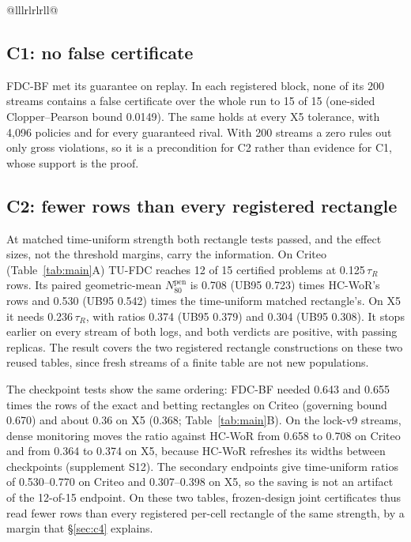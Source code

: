 \documentclass[sigconf,anonymous,review]{acmart}
\newcommand{\Npen}{N_{80}^{\text{pen}}}
\begin{document}
\begin{table}[t]
\begin{tabular}{@{}lllrlrlrll@{}}
\midrule
{} \\
\bottomrule
\end{tabular}
\end{table}

\subsection{C1: no false certificate}\label{sec:c1}

FDC-BF met its guarantee on replay. In each registered block, none of its 200 streams contains a false certificate over the whole run to 15 of 15 (one-sided Clopper--Pearson bound 0.0149). The same holds at every X5 tolerance, with 4,096 policies and for every guaranteed rival. With 200 streams a zero rules out only gross violations, so it is a precondition for C2 rather than evidence for C1, whose support is the proof.

\subsection{C2: fewer rows than every registered rectangle}\label{sec:c2}

At matched time-uniform strength both rectangle tests passed, and the effect sizes, not the threshold margins, carry the information. On Criteo (Table~\ref{tab:main}A) TU-FDC reaches 12 of 15 certified problems at 0.125\,$\tau_R$ rows. Its paired geometric-mean $\Npen$ is 0.708 (UB95 0.723) times HC-WoR's rows and 0.530 (UB95 0.542) times the time-uniform matched rectangle's. On X5 it needs 0.236\,$\tau_R$, with ratios 0.374 (UB95 0.379) and 0.304 (UB95 0.308). It stops earlier on every stream of both logs, and both verdicts are positive, with passing replicas. The result covers the two registered rectangle constructions on these two reused tables, since fresh streams of a finite table are not new populations.

The checkpoint tests show the same ordering: FDC-BF needed 0.643 and 0.655 times the rows of the exact and betting rectangles on Criteo (governing bound 0.670) and about 0.36 on X5 (0.368; Table~\ref{tab:main}B). On the lock-v9 streams, dense monitoring moves the ratio against HC-WoR from 0.658 to 0.708 on Criteo and from 0.364 to 0.374 on X5, because HC-WoR refreshes its widths between checkpoints (supplement S12). The secondary endpoints give time-uniform ratios of 0.530--0.770 on Criteo and 0.307--0.398 on X5, so the saving is not an artifact of the 12-of-15 endpoint. On these two tables, frozen-design joint certificates thus read fewer rows than every registered per-cell rectangle of the same strength, by a margin that \S\ref{sec:c4} explains.
\end{document}
